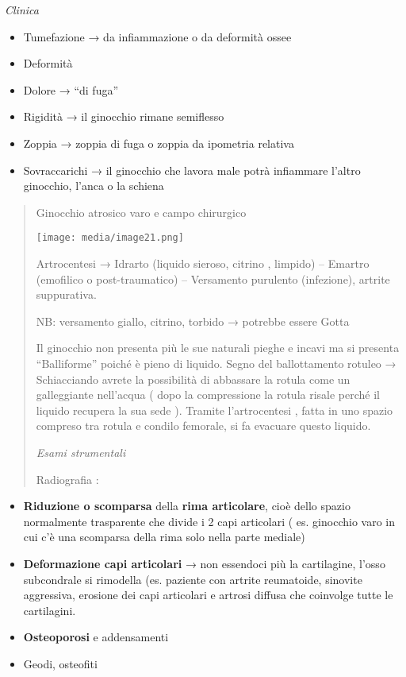 \documentclass[]{article}
\begin{document}
\emph{Clinica }

\begin{itemize}
\item
  Tumefazione → da infiammazione o da deformità ossee
\item
  Deformità
\item
  Dolore → ``di fuga''
\item
  Rigidità → il ginocchio rimane semiflesso
\item
  Zoppia → zoppia di fuga o zoppia da ipometria relativa
\item
  Sovraccarichi → il ginocchio che lavora male potrà infiammare l'altro
  ginocchio, l'anca o la schiena
\end{itemize}

\begin{quote}
Ginocchio atrosico varo e campo chirurgico

\texttt{[image: media/image21.png]}

Artrocentesi → Idrarto (liquido sieroso, citrino , limpido) -- Emartro
(emofilico o post-traumatico) -- Versamento purulento (infezione),
artrite suppurativa.

NB: versamento giallo, citrino, torbido → potrebbe essere Gotta

Il ginocchio non presenta più le sue naturali pieghe e incavi ma si
presenta ``Balliforme'' poiché è pieno di liquido. Segno del
ballottamento rotuleo → Schiacciando avrete la possibilità di abbassare
la rotula come un galleggiante nell'acqua ( dopo la compressione la
rotula risale perché il liquido recupera la sua sede ). Tramite
l'artrocentesi , fatta in uno spazio compreso tra rotula e condilo
femorale, si fa evacuare questo liquido.

\emph{Esami strumentali }

Radiografia :
\end{quote}

\begin{itemize}
\item
  \textbf{Riduzione o scomparsa} della \textbf{rima articolare}, cioè
  dello spazio normalmente trasparente che divide i 2 capi articolari (
  es. ginocchio varo in cui c'è una scomparsa della rima solo nella
  parte mediale)
\item
  \textbf{Deformazione capi articolari} → non essendoci più la
  cartilagine, l'osso subcondrale si rimodella (es. paziente con artrite
  reumatoide, sinovite aggressiva, erosione dei capi articolari e
  artrosi diffusa che coinvolge tutte le cartilagini.
\item
  \textbf{Osteoporosi} e addensamenti
\item
  Geodi, osteofiti
\end{itemize}
\end{document}
